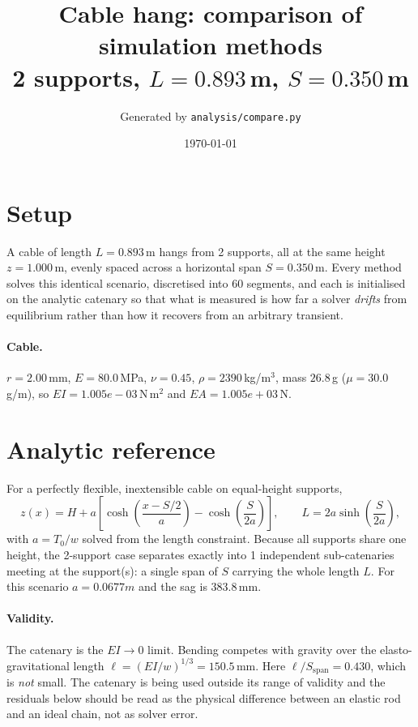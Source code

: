 \documentclass[11pt,a4paper]{article}
\title{Cable hang: comparison of simulation methods\\
\large 2 supports, $L = 0.893$\,m,
$S = 0.350$\,m}
\author{Generated by \texttt{analysis/compare.py}}
\date{\today}
\begin{document}
\maketitle

\section{Setup}

A cable of length $L = 0.893$\,m hangs from
2 supports, all at the same height
$z = 1.000$\,m, evenly spaced across a horizontal span
$S = 0.350$\,m. Every method solves this identical scenario,
discretised into 60 segments, and each is initialised on
the analytic catenary so that what is measured is how far a solver
\emph{drifts} from equilibrium rather than how it recovers from an arbitrary
transient.

\paragraph{Cable.} $r = 2.00$\,mm,
$E = 80.0$\,MPa, $\nu = 0.45$,
$\rho = 2390$\,kg/m$^3$, mass $26.8$\,g
($\mu = 30.0$\,g/m), so
$EI = 1.005e-03$\,N\,m$^2$ and
$EA = 1.005e+03$\,N.

\section{Analytic reference}

For a perfectly flexible, inextensible cable on equal-height supports,
\begin{equation}
  z(x) = H + a\left[\cosh\!\left(\frac{x - S/2}{a}\right)
                    - \cosh\!\left(\frac{S}{2a}\right)\right],
  \qquad L = 2a\sinh\!\left(\frac{S}{2a}\right),
\end{equation}
with $a = T_0/w$ solved from the length constraint. Because all supports share
one height, the 2-support case separates exactly into
1 independent sub-catenaries meeting at the support(s):
a single span of $S$ carrying the whole length $L$.
For this scenario $a = 0.0677 m$ and the sag is
$383.8$\,mm.

\paragraph{Validity.} The catenary is the $EI \to 0$ limit. Bending competes
with gravity over the elasto-gravitational length
$\ell = (EI/w)^{1/3} = 150.5$\,mm. Here $\ell/S_{\mathrm{span}} = 0.430$, which is \emph{not} small. The catenary is being used outside its range of validity and the residuals below should be read as the physical difference between an elastic rod and an ideal chain, not as solver error.
\end{document}
